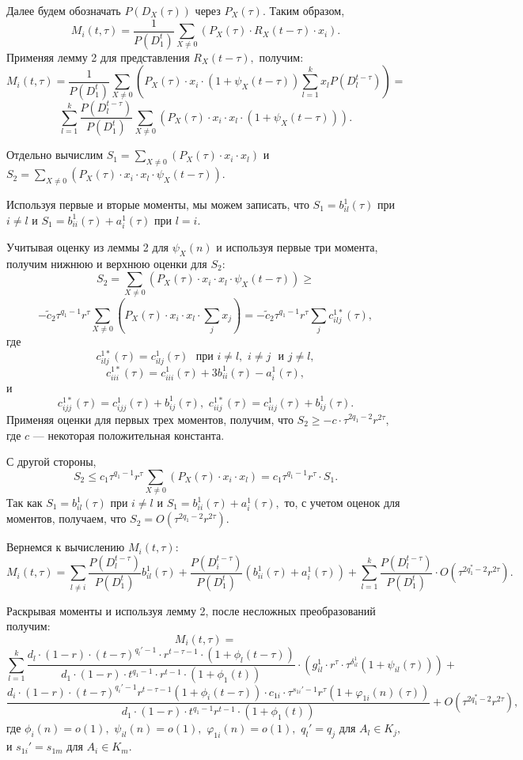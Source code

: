 \documentclass[%
11pt,a4paper]{article}
\begin{document}
{{{Далее будем обозначать $P\left(D_X(\tau)\right)$ через $P_X(\tau).$
Таким образом,
$$
M_i(t,\tau)=\frac{1}{P(D^t_1)} \sum_{X \ne 0}\left( P_X(\tau)\cdot
R_X(t-\tau)\cdot x_{i}\right).
$$
Применяя лемму 2 для представления $R_X(t-\tau),$ получим:
$$
M_i(t,\tau)=\frac{1}{P(D^t_1)} \sum_{X \ne 0}\left( P_X(\tau)\cdot x_{i}\cdot
\left(1+\psi_X(t-\tau)\right)
\sum_{l=1}^k x_l P\left(D_l^{t-\tau}\right)\right)=
$$
$$
\sum_{l=1}^k\frac{P(D_l^{t-\tau})}{P(D^t_1)}
\sum_{X \ne 0}\left( P_X(\tau)\cdot x_{i}\cdot
x_{l}\cdot\left(1+\psi_X(t-\tau)\right)\right).
$$

Отдельно вычислим
$S_1=
\sum_{X \ne 0}\left( P_X(\tau)\cdot x_{i}\cdot x_{l}\right) $
и
$S_2=
\sum_{X \ne 0}\left( P_X(\tau)\cdot x_{i}\cdot x_{l} \cdot \psi_X(t-\tau)\right).$

Используя первые и вторые моменты, мы можем записать, что
$S_1=b^1_{il}(\tau)$ при $i \ne l$ и
$S_1=b^1_{ii}(\tau)+a^1_i(\tau)$ при $l=i.$

Учитывая оценку из леммы 2 для $\psi_X(n)$ и используя
первые три момента, получим нижнюю и верхнюю
оценки для $S_2:$
$$
S_2 =
\sum_{X \ne 0} \left(P_X(\tau)\cdot x_{i}\cdot x_{l} \cdot \psi_X(t-\tau)\right)\ge
$$
$$
-\tilde{c}_2 \tau^{q_1-1} r^{\tau} \sum_{X \ne 0} \left(P_X(\tau)\cdot x_{i}\cdot x_{l} \cdot
\sum_j x_{j}\right)=- \tilde{c}_2 \tau^{q_1-1} r^{\tau}\sum_j c^{1*}_{ilj}(\tau),
$$
где
$$
c^{1*}_{ilj}(\tau)=c^{1}_{ilj}(\tau)
\,\, \mbox { при} \,\, i \ne l, \,\,i \ne j \,\,\mbox { и}\,\, j \ne l,
$$
$$
c^{1*}_{iii}(\tau)=c^{1}_{iii}(\tau)+3 b^1_{ii}(\tau)-a^1_{i}(\tau),
$$
и
$$
c^{1*}_{ijj}(\tau)=c^{1}_{ijj}(\tau)+b^1_{ij}(\tau),\,\,
c^{1*}_{iij}(\tau)=c^{1}_{iij}(\tau)+b^1_{ij}(\tau).
$$
Применяя оценки для первых трех моментов, получим, что
$S_2 \ge -c \cdot\tau^{2 q_1-2} r^{2 \tau},$
где $c$ --- некоторая положительная константа.

С другой стороны,
$$
S_2  \le c_1 \tau^{q_1-1} r^{\tau}
\sum_{X \ne 0} \left(P_X(\tau)\cdot x_{i}\cdot x_{l}\right)= c_1\tau^{q_1-1} r^{\tau}\cdot S_1.
$$
Так как $S_1=b^1_{il}(\tau)$ при $i \ne l$ и $S_1=b^1_{ii}(\tau)+a^1_i(\tau),$
то, с учетом оценок для моментов, получаем, что $S_2=O(\tau^{2q_1-2}r^{2\tau}).$

Вернемся к вычислению $M_i(t,\tau):$
$$
M_i(t,\tau)=
\sum_{l\ne i} \frac{P(D_l^{t-\tau})}{P(D^t_1)}
b^1_{il}(\tau)+ \frac{P(D_i^{t-\tau})}{P(D^t_1)}
\left(b^1_{ii}(\tau)+a^1_i(\tau) \right)+
\sum_{l=1}^k\frac{P(D_l^{t-\tau})}{P(D^t_1)} \cdot O\left(\tau^{2q^{*}_1-2}r^{2\tau}\right).
$$

Раскрывая моменты и используя лемму 2, после
несложных преобразований получим:
$$
M_i(t,\tau)=
$$
$$
\sum_{l=1}^{k} \frac{d_l \cdot(1-r)\cdot (t-\tau)^{q_l'-1} \cdot r^{t-\tau-1} \cdot (1+\phi_l(t-\tau))}
{d_1 \cdot (1-r)\cdot t^{q_1-1} \cdot r^{t-1} \cdot (1+\phi_1(t))}\cdot
\left(g_{il}^1 \cdot r^{\tau}\cdot \tau^{\delta_{il}^1}  \left(1+\psi_{il}(\tau)\right)\right)+
$$
$$
\frac{d_i \cdot (1-r) \cdot (t-\tau)^{q_i'-1} r^{t-\tau-1}(1+\phi_i(t-\tau)) \cdot c_{1i}\cdot
\tau^{s_{1i}'-1} r^{\tau}(1+\varphi_{1i}(n)(\tau))}
{d_1\cdot (1-r)\cdot t^{q_1-1}r^{t-1} \cdot(1+\phi_1(t))}+ O\left(\tau^{2q^{*}_1-2}r^{2\tau}\right),
$$
где $\phi_i(n)=o(1),$ $\psi_{il}(n)=o(1),$ $\varphi_{1i}(n)=o(1),$ $q_l'=q_j$ для $A_l \in K_j,$ и $s_{1i}'=s_{1m}$ для  $A_i \in K_m.$

}}}
\end{document}
